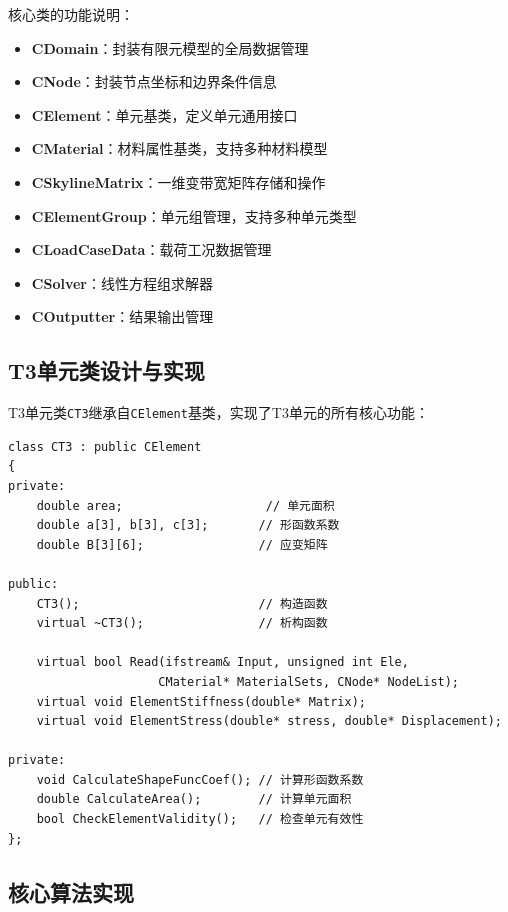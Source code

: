 \documentclass[12pt,a4paper]{article}
\begin{document}
核心类的功能说明：
\begin{itemize}
    \item \textbf{CDomain}：封装有限元模型的全局数据管理
    \item \textbf{CNode}：封装节点坐标和边界条件信息  
    \item \textbf{CElement}：单元基类，定义单元通用接口
    \item \textbf{CMaterial}：材料属性基类，支持多种材料模型
    \item \textbf{CSkylineMatrix}：一维变带宽矩阵存储和操作
    \item \textbf{CElementGroup}：单元组管理，支持多种单元类型
    \item \textbf{CLoadCaseData}：载荷工况数据管理
    \item \textbf{CSolver}：线性方程组求解器
    \item \textbf{COutputter}：结果输出管理
\end{itemize}

\subsection{T3单元类设计与实现}

T3单元类\texttt{CT3}继承自\texttt{CElement}基类，实现了T3单元的所有核心功能：

\begin{lstlisting}[caption=T3单元类声明]
class CT3 : public CElement
{
private:
    double area;                    // 单元面积
    double a[3], b[3], c[3];       // 形函数系数
    double B[3][6];                // 应变矩阵
    
public:
    CT3();                         // 构造函数
    virtual ~CT3();                // 析构函数
    
    virtual bool Read(ifstream& Input, unsigned int Ele, 
                     CMaterial* MaterialSets, CNode* NodeList);
    virtual void ElementStiffness(double* Matrix);
    virtual void ElementStress(double* stress, double* Displacement);
    
private:
    void CalculateShapeFuncCoef(); // 计算形函数系数
    double CalculateArea();        // 计算单元面积
    bool CheckElementValidity();   // 检查单元有效性
};
\end{lstlisting}

\subsection{核心算法实现}
\end{document}
